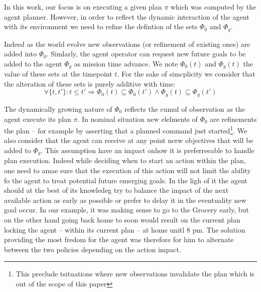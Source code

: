  
In this work, our focus is on executing a given plan $\pi$ which was
computed by the agent planner. However, in order to reflect the
dynamic interaction of the agent with its environment we need to
refine the defintion of the sets $\Phi_0$ and $\Phi_g$. 

Indeed as the world evolve new observations (or refinement of
existing ones) are added into $\Phi_0$. Simlarly, the agent operator
can request new future goals to be added to the agent $\Phi_g$ as
mission time advance. We note $\Phi_0(t)$ and $\Phi_g(t)$ the value 
of these sets at the timepoint $t$. For the sake of simcplicity we
 consider that the alteration of these sets is purely additive with
 time:
\[ \forall \{t, t'\}: t \le t' \Rightarrow \Phi_0(t) \subseteq \Phi_0(t')
\wedge \Phi_g(t) \subseteq \Phi_g(t') \] 

The dynamically growing nature of $\Phi_0$ reflects the cumul of
observation as the agent execute its plan $\pi$. In nominal 
situation new elelments of $\Phi_0$ are refinements the plan 
-- for example by asserting that a planned command just
started\footnote{This preclude tsituations where new observations
  invalidate the plan which is out of the scope of this paper}. We
also consider that the agent can receive at any point nerw objectives
that will be added to $\Phi_g$. This assumption have an impact onhow
it is preferreeable to handle plan execution. Indeed while deciding
when to start an action within the plan, one need to amae  sure that
the execution of this action will not limit the ability fo the agent
to treat potential future emerging goals. In the ligh of it the agent
should at the best of its knowledeg  try to balance the impact of the
next available action as early as possible or prefer to delay it in
the eventuality new goal occur. In our example, it was making sense to
go to the Grocery early, but on the other hand going back home to soon
would result on the current plan locking the agent -- within its current
plan -- at home unitl 8 pm. The solution providing the most fredom for
the agent was therefore for him to alternate between the two policies
depending on the action impact. 

